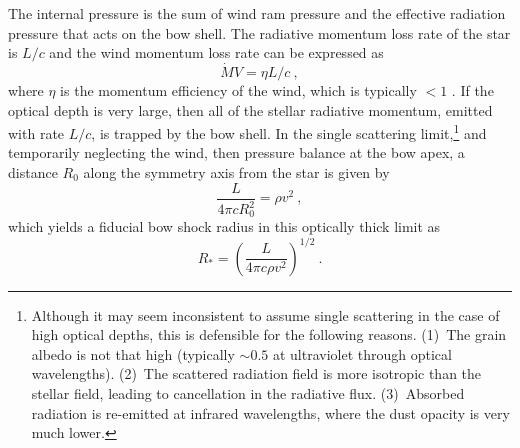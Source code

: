 The internal pressure is the sum of wind ram pressure and the
effective radiation pressure that acts on the bow shell.  The
radiative momentum loss rate of the star is \(L/c\) and the wind
momentum loss rate can be expressed as
\begin{equation}
  \label{eq:wind-efficiency}
  \dot{M} V = \eta L / c \ , 
\end{equation}
where \(\eta\) is the momentum efficiency of the wind, which is typically
\(< 1\) \citep{Lamers:1999b}. If the optical depth is very large, then
all of the stellar radiative momentum, emitted with rate \(L/c\), is
trapped by the bow shell.  In the single scattering limit,\footnote{%
  Although it may seem inconsistent to assume single scattering in the
  case of high optical depths, this is defensible for the following
  reasons. (1)~The grain albedo is not that high (typically
  \(\sim 0.5\) at ultraviolet through optical wavelengths). (2)~The
  scattered radiation field is more isotropic than the stellar field,
  leading to cancellation in the radiative
  flux. (3)~Absorbed radiation is re-emitted at infrared
  wavelengths, where the dust opacity is very much lower.} %
and temporarily neglecting the wind, then pressure balance at the bow
apex, a distance \(R_0\) along the symmetry axis from the star is
given by
\begin{equation}
  \label{eq:rad-press-balance-thick}
  \frac{L}{4 \pi c R_0^2} = \rho v^2 \ ,
\end{equation}
which yields a fiducial bow shock radius in this optically thick limit
as
\begin{equation}
  \label{eq:Rstar}
  R_* = \left(\frac{L}{4\pi c \rho v^2}\right)^{1/2} \ .
\end{equation}

